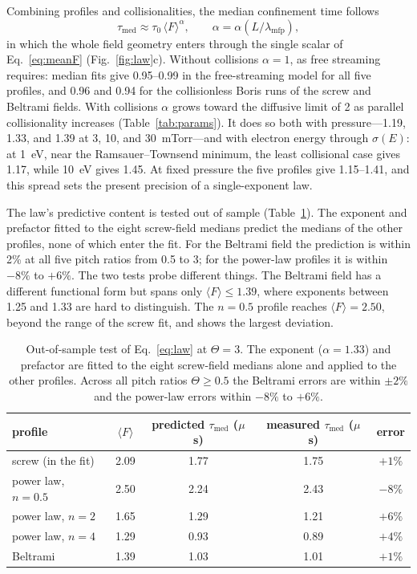 \documentclass[11pt]{article}
\newcommand{\us}{\ensuremath{\mu}s}
\begin{document}
Combining profiles and collisionalities, the median confinement time follows
\begin{equation}
\tau_{\mathrm{med}} \approx \tau_0\,\langle F\rangle^{\alpha}, \qquad \alpha = \alpha(L/\lambda_{\mathrm{mfp}}),
\label{eq:law}
\end{equation}
in which the whole field geometry enters through the single scalar of Eq.~\eqref{eq:meanF} (Fig.~\ref{fig:law}c). Without collisions $\alpha = 1$, as free streaming requires: median fits give 0.95--0.99 in the free-streaming model for all five profiles, and 0.96 and 0.94 for the collisionless Boris runs of the screw and Beltrami fields. With collisions $\alpha$ grows toward the diffusive limit of 2 as parallel collisionality increases (Table~\ref{tab:params}). It does so both with pressure---1.19, 1.33, and 1.39 at 3, 10, and 30~mTorr---and with electron energy through $\sigma(E)$: at 1~eV, near the Ramsauer--Townsend minimum, the least collisional case gives 1.17, while 10~eV gives 1.45. At fixed pressure the five profiles give 1.15--1.41, and this spread sets the present precision of a single-exponent law.

The law's predictive content is tested out of sample (Table~\ref{tab:predict}). The exponent and prefactor fitted to the eight screw-field medians predict the medians of the other profiles, none of which enter the fit. For the Beltrami field the prediction is within 2\% at all five pitch ratios from 0.5 to 3; for the power-law profiles it is within $-8\%$ to $+6\%$. The two tests probe different things. The Beltrami field has a different functional form but spans only $\langle F\rangle \le 1.39$, where exponents between 1.25 and 1.33 are hard to distinguish. The $n = 0.5$ profile reaches $\langle F\rangle = 2.50$, beyond the range of the screw fit, and shows the largest deviation.

\begin{table}[htbp]
\centering
\caption{Out-of-sample test of Eq.~\eqref{eq:law} at $\Theta = 3$. The exponent ($\alpha = 1.33$) and prefactor are fitted to the eight screw-field medians alone and applied to the other profiles. Across all pitch ratios $\Theta \ge 0.5$ the Beltrami errors are within $\pm2\%$ and the power-law errors within $-8\%$ to $+6\%$.}
\label{tab:predict}
\begin{tabular}{lcccc}
\toprule
profile & $\langle F\rangle$ & predicted $\tau_{\mathrm{med}}$ (\us) & measured $\tau_{\mathrm{med}}$ (\us) & error \\
\midrule
screw (in the fit) & 2.09 & 1.77 & 1.75 & $+1\%$ \\
power law, $n = 0.5$ & 2.50 & 2.24 & 2.43 & $-8\%$ \\
power law, $n = 2$ & 1.65 & 1.29 & 1.21 & $+6\%$ \\
power law, $n = 4$ & 1.29 & 0.93 & 0.89 & $+4\%$ \\
Beltrami & 1.39 & 1.03 & 1.01 & $+1\%$ \\
\bottomrule
\end{tabular}
\end{table}
\end{document}
